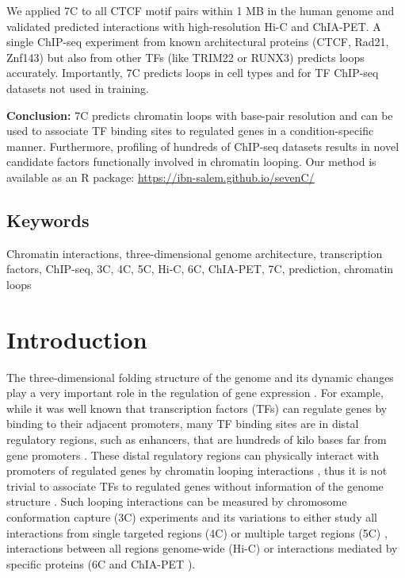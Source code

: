 \documentclass[a4paper,twoside=true,openright,parskip=full,chapterprefix=true,11pt,headings=normal,bibliography=totoc,listof=totoc,titlepage=on,captions=tableabove,draft=false]{scrreprt}
\theoremstyle{definition}
\theoremstyle{definition}
\theoremstyle{definition}
\theoremstyle{remark}
\begin{document}
We applied 7C to all CTCF motif pairs within 1 MB in the human genome
and validated predicted interactions with high-resolution Hi-C and
ChIA-PET. A single ChIP-seq experiment from known architectural proteins
(CTCF, Rad21, Znf143) but also from other TFs (like TRIM22 or RUNX3)
predicts loops accurately. Importantly, 7C predicts loops in cell types
and for TF ChIP-seq datasets not used in training.

\textbf{Conclusion:} 7C predicts chromatin loops with base-pair
resolution and can be used to associate TF binding sites to regulated
genes in a condition-specific manner. Furthermore, profiling of hundreds
of ChIP-seq datasets results in novel candidate factors functionally
involved in chromatin looping. Our method is available as an R package:
\url{https://ibn-salem.github.io/sevenC/}

\hypertarget{keywords-1}{%
\subsection*{Keywords}\label{keywords-1}}

Chromatin interactions, three-dimensional genome architecture,
transcription factors, ChIP-seq, 3C, 4C, 5C, Hi-C, 6C, ChIA-PET, 7C,
prediction, chromatin loops

\hypertarget{introduction-3}{%
\section{Introduction}\label{introduction-3}}

The three-dimensional folding structure of the genome and its dynamic
changes play a very important role in the regulation of gene expression
\citep{Merkenschlager2016, Krijger2016}. For example, while it was well
known that transcription factors (TFs) can regulate genes by binding to
their adjacent promoters, many TF binding sites are in distal regulatory
regions, such as enhancers, that are hundreds of kilo bases far from
gene promoters \citep{Spitz2012}. These distal regulatory regions can
physically interact with promoters of regulated genes by chromatin
looping interactions \citep{Tolhuis2002, Sanyal2012}, thus it is not
trivial to associate TFs to regulated genes without information of the
genome structure \citep{Mora2015}. Such looping interactions can be
measured by chromosome conformation capture (3C) experiments
\citep{Dekker2002} and its variations to either study all interactions
from single targeted regions (4C) \citep{Simonis2006} or multiple target
regions (5C) \citep{Dostie2006}, interactions between all regions
genome-wide (Hi-C) \citep{Lieberman-Aiden2009, Rao2014} or interactions
mediated by specific proteins (6C \citep{Tiwari2008} and ChIA-PET
\citep{Fullwood2009, Tang2015}).
\end{document}
